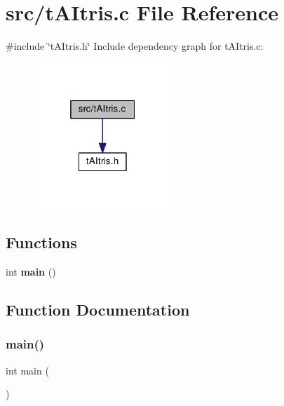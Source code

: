 \section{src/t\+A\+Itris.c File Reference}
\label{tAItris_8c}
{\ttfamily \#include \char`\"{}t\+A\+Itris.\+h\char`\"{}}\newline
Include dependency graph for t\+A\+Itris.\+c\+:\nopagebreak
\begin{figure}[H]
\begin{center}
\leavevmode
\includegraphics[width=148pt]{tAItris_8c__incl}
\end{center}
\end{figure}
\subsection*{Functions}
\begin{DoxyCompactItemize}
\item 
int \textbf{ main} ()
\end{DoxyCompactItemize}


\subsection{Function Documentation}
\mbox{\label{tAItris_8c_ae66f6b31b5ad750f1fe042a706a4e3d4}} 
\subsubsection{main()}
{\footnotesize\ttfamily int main (\begin{DoxyParamCaption}{ }\end{DoxyParamCaption})}

